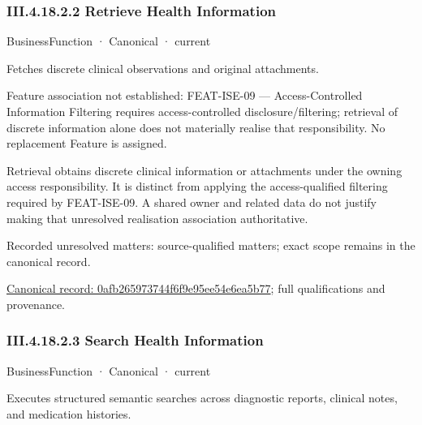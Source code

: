 \subsubsection*{III.4.18.2.2 Retrieve Health Information}
\label{navigation:III.4.18.2.2}

\label{element:0afb265973744f6f9e95ee54e6ea5b77}
{\small BusinessFunction · Canonical · current}\par

Fetches discrete clinical observations and original attachments.



Feature association not established: FEAT-ISE-09 — Access-Controlled Information Filtering requires access-controlled disclosure/filtering; retrieval of discrete information alone does not materially realise that responsibility. No replacement Feature is assigned.



Retrieval obtains discrete clinical information or attachments under the owning access responsibility. It is distinct from applying the access-qualified filtering required by FEAT-ISE-09. A shared owner and related data do not justify making that unresolved realisation association authoritative.


{\small Recorded unresolved matters: source-qualified matters; exact scope remains in the canonical record.}\par
{\footnotesize \href{../../../../continuum/business/business-function/0afb265973744f6f9e95ee54e6ea5b77.md}{Canonical record: 0afb265973744f6f9e95ee54e6ea5b77}; full qualifications and provenance.}\par
\subsubsection*{III.4.18.2.3 Search Health Information}
\label{navigation:III.4.18.2.3}

\label{element:2e75f678b9814305b1cb2e810f4f0e9e}
{\small BusinessFunction · Canonical · current}\par

Executes structured semantic searches across diagnostic reports, clinical notes, and medication histories.


